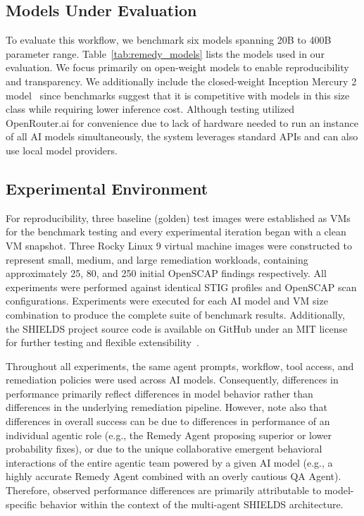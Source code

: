 \documentclass[pdflatex,sn-mathphys-num]{sn-jnl}%
\begin{document}
\subsection{Models Under Evaluation}\label{sec:models}

To evaluate this workflow, we benchmark six models spanning 20B to 400B parameter range. Table~\ref{tab:remedy_models} lists the models used in our evaluation. We focus primarily on open-weight models to enable reproducibility and transparency. We additionally include the closed-weight Inception Mercury 2 model~\cite{mercury} since benchmarks suggest that it is competitive with models in this size class while requiring lower inference cost. Although testing utilized OpenRouter.ai for convenience due to lack of hardware needed to run an instance of all AI models simultaneously, the system leverages standard APIs and can also use local model providers.

\subsection{Experimental Environment}\label{sec:testimages}

For reproducibility, three baseline (golden) test images were established as VMs for the benchmark testing and every experimental iteration began with a clean VM snapshot. Three Rocky Linux 9 virtual machine images were constructed to represent small, medium, and large remediation workloads, containing approximately 25, 80, and 250 initial OpenSCAP findings respectively. All experiments were performed against identical STIG profiles and OpenSCAP scan configurations. Experiments were executed for each AI model and VM size combination to produce the complete suite of benchmark results. Additionally, the SHIELDS project source code is available on GitHub under an MIT license for further testing and flexible extensibility~\cite{GitHubSHIELDS}.

Throughout all experiments, the same agent prompts, workflow, tool access, and remediation policies were used across AI models. Consequently, differences in performance primarily reflect differences in model behavior rather than differences in the underlying remediation pipeline. However, note also that differences in overall success can be due to differences in performance of an individual agentic role (e.g., the Remedy Agent proposing superior or lower probability fixes), or due to the unique collaborative emergent behavioral interactions of the entire agentic team powered by a given AI model (e.g., a highly accurate Remedy Agent combined with an overly cautious QA Agent). Therefore, observed performance differences are primarily attributable to model-specific behavior within the context of the multi-agent SHIELDS architecture.
\end{document}
